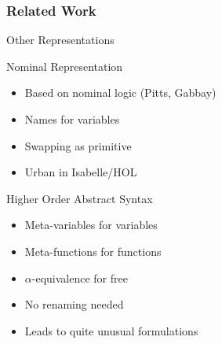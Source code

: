 \documentclass[notheorems]{beamer}
\begin{document}


\begin{frame}

  \frametitle{Related Work}

  Other Representations

  \begin{block}{Nominal Representation}
    \begin{itemize}
    \item Based on nominal logic (Pitts, Gabbay)
    \item Names for variables
    \item Swapping as primitive
    \item Urban in Isabelle/HOL
    \end{itemize}
  \end{block}

  \begin{block}{Higher Order Abstract Syntax}
    \begin{itemize}
    \item Meta-variables for variables
    \item Meta-functions for functions
    \item $\alpha$-equivalence for free
    \item No renaming needed
    \item Leads to quite unusual formulations
    \end{itemize}
  \end{block}

\end{frame}
\end{document}
